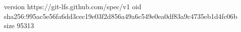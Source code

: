 version https://git-lfs.github.com/spec/v1
oid sha256:995ac5e56fa6dd3cec19e03f2d856a49a6c549e0ea0df83a9c4735eb1d4fc06b
size 95313
